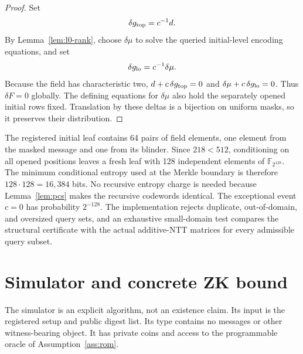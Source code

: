 \documentclass[11pt]{article}
\theoremstyle{definition}
\newcommand{\F}{\mathbb{F}}
\newcommand{\K}{\F_{2^{128}}}
\begin{document}
\begin{proof}
Set
\[
  \delta g_{\rm top}=c^{-1}d.
\]
By Lemma~\ref{lem:l0-rank}, choose $\delta\mu$ to solve the queried
initial-level encoding equations, and
set
\[
  \delta g_{\rm lo}=c^{-1}\delta\mu.
\]
Because the field has characteristic two,
$d+c\,\delta g_{\rm top}=0$ and
$\delta\mu+c\,\delta g_{\rm lo}=0$.  Thus $\delta F=0$ globally.  The defining
equations for $\delta\mu$ also hold the separately opened initial rows fixed.
Translation by these deltas is a bijection on uniform masks, so it preserves
their distribution.
\end{proof}

The registered initial leaf contains 64 pairs of field elements, one element
from the masked message and one from its blinder.  Since $218<512$, conditioning
on all opened positions leaves a fresh leaf with 128 independent elements of
$\K$.  The minimum conditional entropy used at the Merkle boundary is therefore
$128\cdot128=16{,}384$ bits.  No recursive entropy charge is needed because
Lemma~\ref{lem:pcs} makes the recursive codewords identical.  The exceptional
event $c=0$ has probability $2^{-128}$.  The implementation rejects duplicate,
out-of-domain, and oversized query sets, and an exhaustive small-domain test
compares the structural certificate with the actual additive-NTT matrices for
every admissible query subset.

\section{Simulator and concrete ZK bound}\label{sec:simulation}

The simulator is an explicit algorithm, not an existence claim.  Its input is
the registered setup and public digest list.  Its type contains no messages or
other witness-bearing object.  It has private coins and access to the
programmable oracle of Assumption~\ref{ass:rom}.
\end{document}
